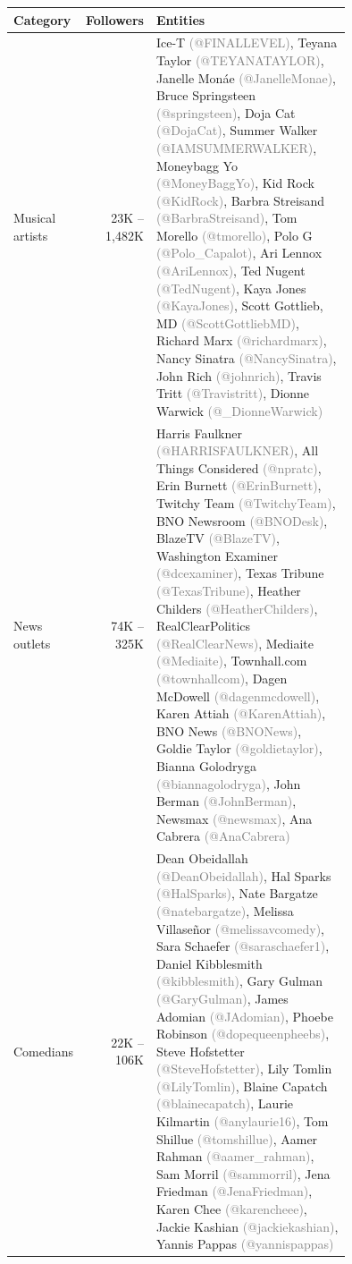 \begin{tabular}{lrp{0.75\linewidth}}
\toprule
Category & Followers & Entities \\
\midrule
Musical artists & 23K -- 1,482K & Ice-T {\textcolor{gray}{(@FINALLEVEL)}}, Teyana Taylor {\textcolor{gray}{(@TEYANATAYLOR)}}, Janelle Monáe {\textcolor{gray}{(@JanelleMonae)}}, Bruce Springsteen {\textcolor{gray}{(@springsteen)}}, Doja Cat {\textcolor{gray}{(@DojaCat)}}, Summer Walker {\textcolor{gray}{(@IAMSUMMERWALKER)}}, Moneybagg Yo {\textcolor{gray}{(@MoneyBaggYo)}}, Kid Rock {\textcolor{gray}{(@KidRock)}}, Barbra Streisand {\textcolor{gray}{(@BarbraStreisand)}}, Tom Morello {\textcolor{gray}{(@tmorello)}}, Polo G {\textcolor{gray}{(@Polo\_Capalot)}}, Ari Lennox {\textcolor{gray}{(@AriLennox)}}, Ted Nugent {\textcolor{gray}{(@TedNugent)}}, Kaya Jones {\textcolor{gray}{(@KayaJones)}}, Scott Gottlieb, MD {\textcolor{gray}{(@ScottGottliebMD)}}, Richard Marx {\textcolor{gray}{(@richardmarx)}}, Nancy Sinatra {\textcolor{gray}{(@NancySinatra)}}, John Rich {\textcolor{gray}{(@johnrich)}}, Travis Tritt {\textcolor{gray}{(@Travistritt)}}, Dionne Warwick {\textcolor{gray}{(@\_DionneWarwick)}} \\
News outlets & 74K -- 325K & Harris Faulkner {\textcolor{gray}{(@HARRISFAULKNER)}}, All Things Considered {\textcolor{gray}{(@npratc)}}, Erin Burnett {\textcolor{gray}{(@ErinBurnett)}}, Twitchy Team {\textcolor{gray}{(@TwitchyTeam)}}, BNO Newsroom {\textcolor{gray}{(@BNODesk)}}, BlazeTV {\textcolor{gray}{(@BlazeTV)}}, Washington Examiner {\textcolor{gray}{(@dcexaminer)}}, Texas Tribune {\textcolor{gray}{(@TexasTribune)}}, Heather Childers {\textcolor{gray}{(@HeatherChilders)}}, RealClearPolitics {\textcolor{gray}{(@RealClearNews)}}, Mediaite {\textcolor{gray}{(@Mediaite)}}, Townhall.com {\textcolor{gray}{(@townhallcom)}}, Dagen McDowell {\textcolor{gray}{(@dagenmcdowell)}}, Karen Attiah {\textcolor{gray}{(@KarenAttiah)}}, BNO News {\textcolor{gray}{(@BNONews)}}, Goldie Taylor {\textcolor{gray}{(@goldietaylor)}}, Bianna Golodryga {\textcolor{gray}{(@biannagolodryga)}}, John Berman {\textcolor{gray}{(@JohnBerman)}}, Newsmax {\textcolor{gray}{(@newsmax)}}, Ana Cabrera {\textcolor{gray}{(@AnaCabrera)}} \\
Comedians & 22K -- 106K & Dean Obeidallah {\textcolor{gray}{(@DeanObeidallah)}}, Hal Sparks {\textcolor{gray}{(@HalSparks)}}, Nate Bargatze {\textcolor{gray}{(@natebargatze)}}, Melissa Villaseñor {\textcolor{gray}{(@melissavcomedy)}}, Sara Schaefer {\textcolor{gray}{(@saraschaefer1)}}, Daniel Kibblesmith {\textcolor{gray}{(@kibblesmith)}}, Gary Gulman {\textcolor{gray}{(@GaryGulman)}}, James Adomian {\textcolor{gray}{(@JAdomian)}}, Phoebe Robinson {\textcolor{gray}{(@dopequeenpheebs)}}, Steve Hofstetter {\textcolor{gray}{(@SteveHofstetter)}}, Lily Tomlin {\textcolor{gray}{(@LilyTomlin)}}, Blaine Capatch {\textcolor{gray}{(@blainecapatch)}}, Laurie Kilmartin {\textcolor{gray}{(@anylaurie16)}}, Tom Shillue {\textcolor{gray}{(@tomshillue)}}, Aamer Rahman {\textcolor{gray}{(@aamer\_rahman)}}, Sam Morril {\textcolor{gray}{(@sammorril)}}, Jena Friedman {\textcolor{gray}{(@JenaFriedman)}}, Karen Chee {\textcolor{gray}{(@karencheee)}}, Jackie Kashian {\textcolor{gray}{(@jackiekashian)}}, Yannis Pappas {\textcolor{gray}{(@yannispappas)}} \\

\end{tabular}

